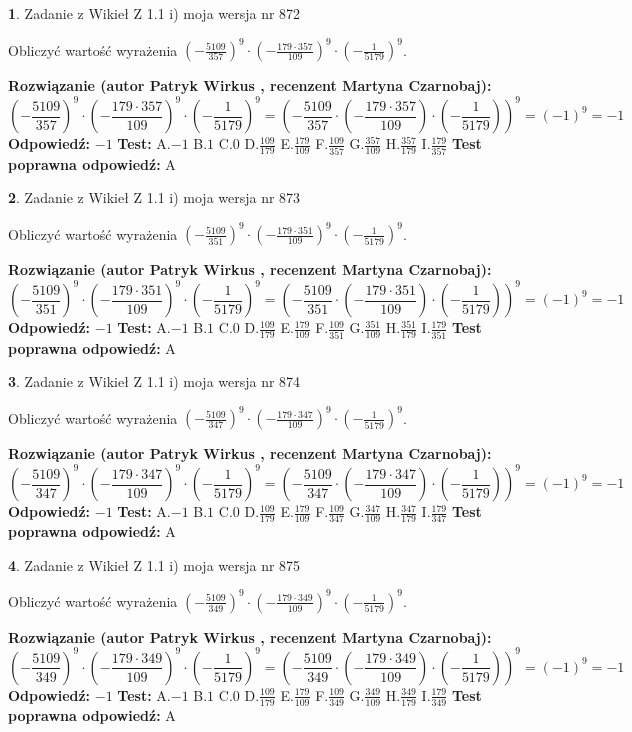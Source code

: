 \documentclass[12pt, a4paper]{article}
\theoremstyle{definition} %
\newtheorem{zad}{}
\newcommand{\zadStart}[1]{\begin{zad}#1\newline}
\newcommand{\zadStop}{\end{zad}}
\newcommand{\rozwStart}[2]{\noindent \textbf{Rozwiązanie (autor #1 , recenzent #2): }\newline}
\newcommand{\rozwStop}{\newline}
\newcommand{\odpStart}{\noindent \textbf{Odpowiedź:}\newline}
\newcommand{\odpStop}{\newline}
\newcommand{\testStart}{\noindent \textbf{Test:}\newline}
\newcommand{\testStop}{\newline}
\newcommand{\kluczStart}{\noindent \textbf{Test poprawna odpowiedź:}\newline}
\newcommand{\kluczStop}{\newline}
\begin{document}
\zadStart{Zadanie z Wikieł Z 1.1 i) moja wersja nr 872}

Obliczyć wartość wyrażenia $(-\frac{5109}{357})^{9} \cdot (-\frac{179 \cdot 357}{109})^{9} \cdot (-\frac{1}{5179})^{9}$.
\zadStop
\rozwStart{Patryk Wirkus}{Martyna Czarnobaj}
$$(-\frac{5109}{357})^{9} \cdot (-\frac{179 \cdot 357}{109})^{9} \cdot (-\frac{1}{5179})^{9} = (-\frac{5109}{357} \cdot (-\frac{179 \cdot 357}{109}) \cdot (-\frac{1}{5179}))^{9} = (-1)^{9} = -1$$
\rozwStop
\odpStart
$-1$
\odpStop
\testStart
A.$-1$ B.$1$ C.$0$ D.$\frac{109}{179}$ E.$\frac{179}{109}$
F.$\frac{109}{357}$ G.$\frac{357}{109}$
H.$\frac{357}{179}$
I.$\frac{179}{357}$
\testStop
\kluczStart
A
\kluczStop



\zadStart{Zadanie z Wikieł Z 1.1 i) moja wersja nr 873}

Obliczyć wartość wyrażenia $(-\frac{5109}{351})^{9} \cdot (-\frac{179 \cdot 351}{109})^{9} \cdot (-\frac{1}{5179})^{9}$.
\zadStop
\rozwStart{Patryk Wirkus}{Martyna Czarnobaj}
$$(-\frac{5109}{351})^{9} \cdot (-\frac{179 \cdot 351}{109})^{9} \cdot (-\frac{1}{5179})^{9} = (-\frac{5109}{351} \cdot (-\frac{179 \cdot 351}{109}) \cdot (-\frac{1}{5179}))^{9} = (-1)^{9} = -1$$
\rozwStop
\odpStart
$-1$
\odpStop
\testStart
A.$-1$ B.$1$ C.$0$ D.$\frac{109}{179}$ E.$\frac{179}{109}$
F.$\frac{109}{351}$ G.$\frac{351}{109}$
H.$\frac{351}{179}$
I.$\frac{179}{351}$
\testStop
\kluczStart
A
\kluczStop



\zadStart{Zadanie z Wikieł Z 1.1 i) moja wersja nr 874}

Obliczyć wartość wyrażenia $(-\frac{5109}{347})^{9} \cdot (-\frac{179 \cdot 347}{109})^{9} \cdot (-\frac{1}{5179})^{9}$.
\zadStop
\rozwStart{Patryk Wirkus}{Martyna Czarnobaj}
$$(-\frac{5109}{347})^{9} \cdot (-\frac{179 \cdot 347}{109})^{9} \cdot (-\frac{1}{5179})^{9} = (-\frac{5109}{347} \cdot (-\frac{179 \cdot 347}{109}) \cdot (-\frac{1}{5179}))^{9} = (-1)^{9} = -1$$
\rozwStop
\odpStart
$-1$
\odpStop
\testStart
A.$-1$ B.$1$ C.$0$ D.$\frac{109}{179}$ E.$\frac{179}{109}$
F.$\frac{109}{347}$ G.$\frac{347}{109}$
H.$\frac{347}{179}$
I.$\frac{179}{347}$
\testStop
\kluczStart
A
\kluczStop



\zadStart{Zadanie z Wikieł Z 1.1 i) moja wersja nr 875}

Obliczyć wartość wyrażenia $(-\frac{5109}{349})^{9} \cdot (-\frac{179 \cdot 349}{109})^{9} \cdot (-\frac{1}{5179})^{9}$.
\zadStop
\rozwStart{Patryk Wirkus}{Martyna Czarnobaj}
$$(-\frac{5109}{349})^{9} \cdot (-\frac{179 \cdot 349}{109})^{9} \cdot (-\frac{1}{5179})^{9} = (-\frac{5109}{349} \cdot (-\frac{179 \cdot 349}{109}) \cdot (-\frac{1}{5179}))^{9} = (-1)^{9} = -1$$
\rozwStop
\odpStart
$-1$
\odpStop
\testStart
A.$-1$ B.$1$ C.$0$ D.$\frac{109}{179}$ E.$\frac{179}{109}$
F.$\frac{109}{349}$ G.$\frac{349}{109}$
H.$\frac{349}{179}$
I.$\frac{179}{349}$
\testStop
\kluczStart
A
\kluczStop
\end{document}
